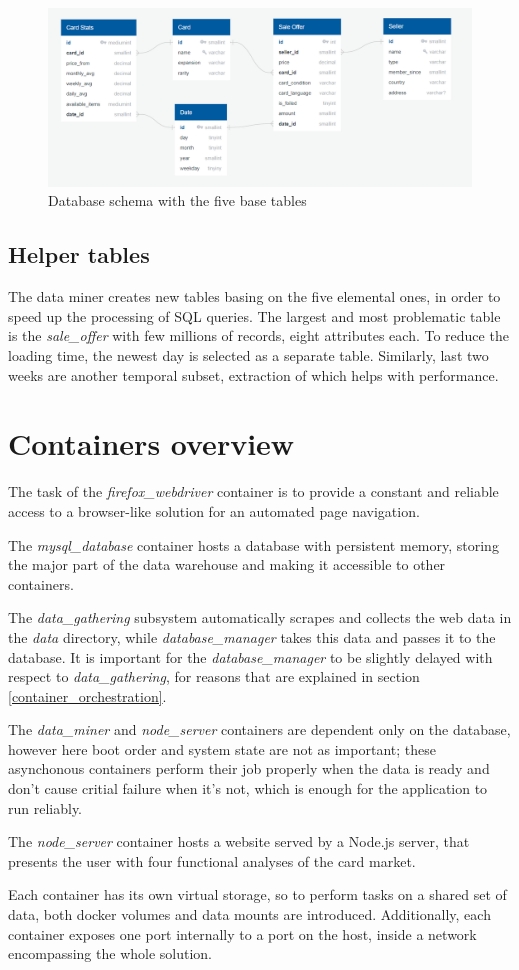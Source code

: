 \begin{figure}[ht]
    \centering
    \includegraphics[width=\textwidth]{figures/database.png}
    \caption{Database schema with the five base tables}
    \label{fig:database}
\end{figure}

\subsection{Helper tables}
The data miner creates new tables basing on the five elemental ones, in order to speed up the processing of SQL queries. The largest and most problematic table is the \textit{sale\_offer} with few millions of records, eight attributes each. To reduce the loading time, the newest day is selected as a separate table. Similarly, last two weeks are another temporal subset, extraction of which helps with performance.

\section{Containers overview}
The task of the \textit{firefox\_webdriver} container is to provide a constant and reliable access to a browser-like solution for an automated page navigation.

The \textit{mysql\_database} container hosts a database with persistent memory, storing the major part of the data warehouse and making it accessible to other containers.

The \textit{data\_gathering} subsystem automatically scrapes and collects the web data in the \textit{data} directory, while \textit{database\_manager} takes this data and passes it to the database. It is important for the \textit{database\_manager} to be slightly delayed with respect to \textit{data\_gathering}, for reasons that are explained in section \ref{container_orchestration}.

The \textit{data\_miner} and \textit{node\_server} containers are dependent only on the database, however here boot order and system state are not as important; these asynchonous containers perform their job properly when the data is ready and don't cause critial failure when it's not, which is enough for the application to run reliably.

The \textit{node\_server} container hosts a website served by a Node.js server, that presents the user with four functional analyses of the card market.

Each container has its own virtual storage, so to perform tasks on a shared set of data, both docker volumes and data mounts are introduced. Additionally, each container exposes one port internally to a port on the host, inside a network encompassing the whole solution.
